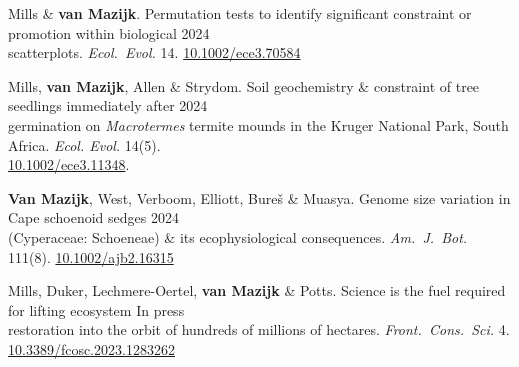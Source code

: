 

Mills \& \textbf{van Mazijk}.
Permutation tests to identify significant constraint or promotion within biological \hfill 2024 \\
\hspace{2em} scatterplots.
  \textit{Ecol.~Evol.}
  14. \href{http://dx.doi.org/10.1002/ece3.70584}{10.1002/ece3.70584}

Mills, \textbf{van Mazijk}, Allen \& Strydom.
Soil geochemistry \& constraint of tree seedlings immediately after
                                                              \hfill 2024 \\
\hspace{2em} germination on \textit{Macrotermes} termite
  mounds in the Kruger National Park, South Africa.
  \textit{Ecol. Evol.} 14(5). \\
  \hspace{2em} \href{http://dx.doi.org/10.1002/ece3.11348}{10.1002/ece3.11348}.

\textbf{Van Mazijk}, West, Verboom, Elliott, Bureš \& Muasya.
Genome size variation in Cape schoenoid sedges                \hfill 2024 \\
\hspace{2em} (Cyperaceae: Schoeneae) \& its ecophysiological consequences.
  \textit{Am.~J.~Bot.}
  111(8).
  \href{http://dx.doi.org/10.1002/ajb2.16315}{10.1002/ajb2.16315}

Mills, Duker, Lechmere-Oertel, \textbf{van Mazijk} \& Potts.
Science is the fuel required for lifting ecosystem             \hfill In press \\
\hspace{2em} restoration into the orbit of hundreds of millions of hectares.
  \textit{Front.~Cons.~Sci.}
  4. \\
  \hspace{2em} \href{https://doi.org/10.3389/fcosc.2023.1283262}{10.3389/fcosc.2023.1283262}

